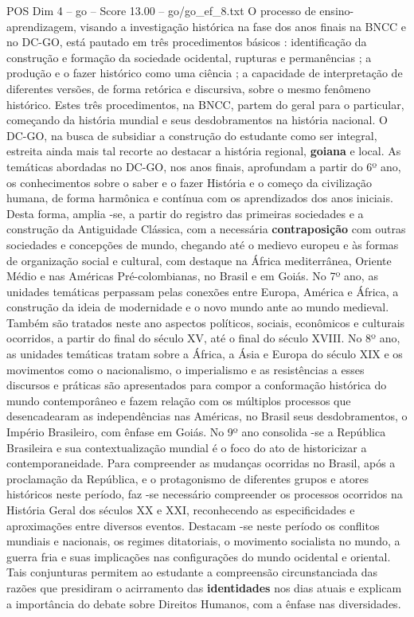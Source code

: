 \begin{textsample}{POS Dim 4 – go – Score 13.00 – go/go\_ef\_8.txt}
O processo de ensino-aprendizagem, visando a investigação histórica na fase dos anos finais na BNCC e no DC-GO, está pautado em três procedimentos básicos : identificação da construção e formação da sociedade ocidental, rupturas e permanências ; a produção e o fazer histórico como uma ciência ; a capacidade de interpretação de diferentes versões, de forma retórica e discursiva, sobre o mesmo fenômeno histórico.
Estes três procedimentos, na BNCC, partem do geral para o particular, começando da história mundial e seus desdobramentos na história nacional.
O DC-GO, na busca de subsidiar a construção do estudante como ser integral, estreita ainda mais tal recorte ao destacar a história regional, \textbf{goiana} e local.
As temáticas abordadas no DC-GO, nos anos finais, aprofundam a partir do 6º ano, os conhecimentos sobre o saber e o fazer História e o começo da civilização humana, de forma harmônica e contínua com os aprendizados dos anos iniciais.
Desta forma, amplia -se, a partir do registro das primeiras sociedades e a construção da Antiguidade Clássica, com a necessária \textbf{contraposição} com outras sociedades e concepções de mundo, chegando até o medievo europeu e às formas de organização social e cultural, com destaque na África mediterrânea, Oriente Médio e nas Américas Pré-colombianas, no Brasil e em Goiás.
No 7º ano, as unidades temáticas perpassam pelas conexões entre Europa, América e África, a construção da ideia de modernidade e o novo mundo ante ao mundo medieval.
Também são tratados neste ano aspectos políticos, sociais, econômicos e culturais ocorridos, a partir do final do século XV, até o final do século XVIII.
No 8º ano, as unidades temáticas tratam sobre a África, a Ásia e Europa do século XIX e os movimentos como o nacionalismo, o imperialismo e as resistências a esses discursos e práticas são apresentados para compor a conformação histórica do mundo contemporâneo e fazem relação com os múltiplos processos que desencadearam as independências nas Américas, no Brasil seus desdobramentos, o Império Brasileiro, com ênfase em Goiás.
No 9º ano consolida -se a República Brasileira e sua contextualização mundial é o foco do ato de historicizar a contemporaneidade.
Para compreender as mudanças ocorridas no Brasil, após a proclamação da República, e o protagonismo de diferentes grupos e atores históricos neste período, faz -se necessário compreender os processos ocorridos na História Geral dos séculos XX e XXI, reconhecendo as especificidades e aproximações entre diversos eventos.
Destacam -se neste período os conflitos mundiais e nacionais, os regimes ditatoriais, o movimento socialista no mundo, a guerra fria e suas implicações nas configurações do mundo ocidental e oriental.
Tais conjunturas permitem ao estudante a compreensão circunstanciada das razões que presidiram o acirramento das \textbf{identidades} nos dias atuais e explicam a importância do debate sobre Direitos Humanos, com a ênfase nas diversidades.

\end{textsample}
